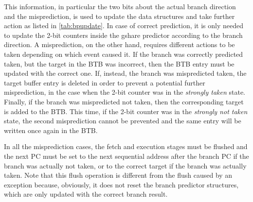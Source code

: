 This information, in particular the two bits about the actual branch direction and the misprediction, is used to update the data structures and take further action as listed in \cref{tab:bpupdate}. In case of correct prediction, it is only needed to update the 2-bit counters inside the gshare predictor according to the branch direction. A misprediction, on the other hand, requires different actions to be taken depending on which event caused it. If the branch was correctly predicted taken, but the target in the \ac{BTB} was incorrect, then the \ac{BTB} entry must be updated with the correct one. If, instead, the branch was mispredicted taken, the target buffer entry is deleted in order to prevent a potential further misprediction, in the case when the 2-bit counter was in the \emph{strongly taken} state. Finally, if the branch was mispredicted not taken, then the corresponding target is added to the \ac{BTB}. This time, if the 2-bit counter was in the \emph{strongly not taken} state, the second misprediction cannot be prevented and the same entry will be written once again in the \ac{BTB}.

In all the misprediction cases, the fetch and execution stages must be flushed and the next \ac{PC} must be set to the next sequential address after the branch \ac{PC} if the branch was actually not taken, or to the correct target if the branch was actually taken. Note that this flush operation is different from the flush caused by an exception because, obviously, it does not reset the branch predictor structures, which are only updated with the correct branch result.

